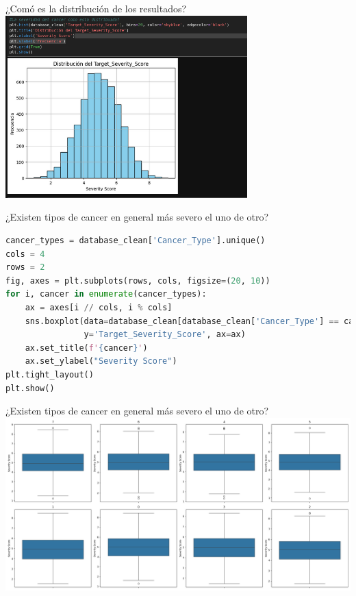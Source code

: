 \documentclass{beamer}
\begin{document}
    \begin{frame}[fragile]{¿Comó es la distribución de los resultados?}
    \center
    \includegraphics[width=0.7\textwidth]{../figures/img3.png}
    \end{frame}
    \begin{frame}[fragile]{¿Existen tipos de cancer en general más severo el uno de otro?}

    \scriptsize
    \begin{lstlisting}[language=Python]
cancer_types = database_clean['Cancer_Type'].unique()
cols = 4
rows = 2
fig, axes = plt.subplots(rows, cols, figsize=(20, 10))
for i, cancer in enumerate(cancer_types):
    ax = axes[i // cols, i % cols]
    sns.boxplot(data=database_clean[database_clean['Cancer_Type'] == cancer],
                y='Target_Severity_Score', ax=ax)
    ax.set_title(f'{cancer}')
    ax.set_ylabel("Severity Score")
plt.tight_layout()
plt.show()
    \end{lstlisting}
    \end{frame}
    \begin{frame}[fragile]{¿Existen tipos de cancer en general más severo el uno de otro?}
    \center
    \hspace*{-1cm}
    \includegraphics[width=1.16\textwidth,keepaspectratio]{../figures/img4.png}
    \end{frame}
\end{document}
